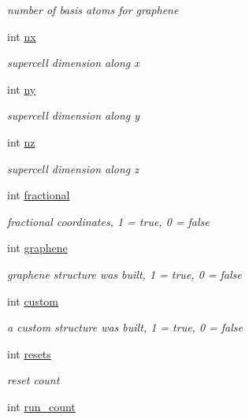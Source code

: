 \begin{DoxyCompactItemize}
\begin{DoxyCompactList}\small\item\em number of basis atoms for graphene \end{DoxyCompactList}\item 
int \hyperlink{class_gui_a6cb804a1531c51117e44674f83a3fbed}{nx}
\begin{DoxyCompactList}\small\item\em supercell dimension along x \end{DoxyCompactList}\item 
int \hyperlink{class_gui_a6a052cca0478f86e3c80535db522fe0a}{ny}
\begin{DoxyCompactList}\small\item\em supercell dimension along y \end{DoxyCompactList}\item 
int \hyperlink{class_gui_aa2511bfa549615e75150f6e5fe81b5c0}{nz}
\begin{DoxyCompactList}\small\item\em supercell dimension along z \end{DoxyCompactList}\item 
int \hyperlink{class_gui_a7b7337d99ba2860adbe3ab2e48d35338}{fractional}
\begin{DoxyCompactList}\small\item\em fractional coordinates, 1 = true, 0 = false \end{DoxyCompactList}\item 
int \hyperlink{class_gui_ae0e6f586344389900c55dc4eaa5206db}{graphene}
\begin{DoxyCompactList}\small\item\em graphene structure was built, 1 = true, 0 = false \end{DoxyCompactList}\item 
int \hyperlink{class_gui_aedb074749fe28d1c9b11b5200017b1a7}{custom}
\begin{DoxyCompactList}\small\item\em a custom structure was built, 1 = true, 0 = false \end{DoxyCompactList}\item 
int \hyperlink{class_gui_a45506f3be90d2d61d0ec66205384e823}{resets}
\begin{DoxyCompactList}\small\item\em reset count \end{DoxyCompactList}\item 
int \hyperlink{class_gui_a4140b79a0f551c7650ecb3a2571c1e83}{run\+\_\+count}

\end{DoxyCompactItemize}
